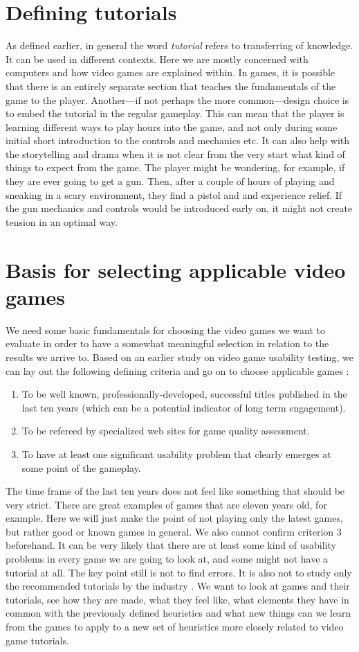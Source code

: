 \section{Defining tutorials}
As defined earlier, in general the word \textit{tutorial} refers to transferring of knowledge. It can be used in different contexts. Here we are mostly concerned with computers and how video games are explained within. In games, it is possible that there is an entirely separate section that teaches the fundamentals of the game to the player. Another---if not perhaps the more common---design choice is to embed the tutorial in the regular gameplay. This can mean that the player is learning different ways to play hours into the game, and not only during some initial short introduction to the controls and mechanics etc. It can also help with the storytelling and drama when it is not clear from the very start what kind of things to expect from the game. The player might be wondering, for example, if they are ever going to get a gun. Then, after a couple of hours of playing and sneaking in a scary environment, they find a pistol and and experience relief. If the gun mechanics and controls would be introduced early on, it might not create tension in an optimal way.

\section{Basis for selecting applicable video games}
We need some basic fundamentals for choosing the video games we want to evaluate in order to have a somewhat meaningful selection in relation to the results we arrive to. Based on an earlier study on video game usability testing, we can lay out the following defining criteria and go on to choose applicable games \cite{Febretti2009a}:
\begin{enumerate}
	\item To be well known, professionally-developed, successful titles published in the last ten years (which can be a potential indicator of long term engagement).
	\item To be refereed by specialized web sites for game quality assessment.
	\item To have at least one significant usability problem that clearly emerges at some point of the gameplay.
\end{enumerate}

The time frame of the last ten years does not feel like something that should be very strict. There are great examples of games that are eleven years old, for example. Here we will just make the point of not playing only the latest games, but rather good or known games in general. We also cannot confirm criterion 3 beforehand. It can be very likely that there are at least some kind of usability problems in every game we are going to look at, and some might not have a tutorial at all. The key point still is not to find errors. It is also not to study only the recommended tutorials by the industry \cite{Bradley}. We want to look at games and their tutorials, see how they are made, what they feel like, what elements they have in common with the previously defined heuristics and what new things can we learn from the games to apply to a new set of heuristics more closely related to video game tutorials.